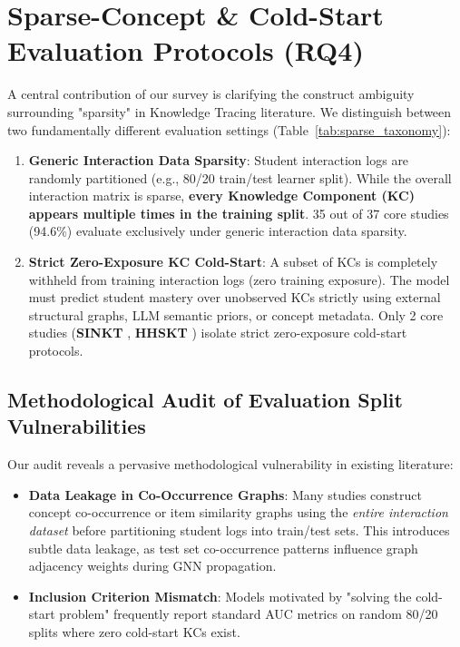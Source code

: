 \documentclass[10pt,journal,compsoc]{IEEEtran}
\begin{document}
\section{Sparse-Concept \& Cold-Start Evaluation Protocols (RQ4)}

A central contribution of our survey is clarifying the construct ambiguity surrounding "sparsity" in Knowledge Tracing literature. We distinguish between two fundamentally different evaluation settings (Table~\ref{tab:sparse_taxonomy}):
\begin{enumerate}
    \item \textbf{Generic Interaction Data Sparsity}: Student interaction logs are randomly partitioned (e.g., 80/20 train/test learner split). While the overall interaction matrix is sparse, \textbf{every Knowledge Component (KC) appears multiple times in the training split}. 35 out of 37 core studies (94.6\%) evaluate exclusively under generic interaction data sparsity.
    \item \textbf{Strict Zero-Exposure KC Cold-Start}: A subset of KCs is completely withheld from training interaction logs (zero training exposure). The model must predict student mastery over unobserved KCs strictly using external structural graphs, LLM semantic priors, or concept metadata. Only 2 core studies (\textbf{SINKT} \cite{KT044_SINKT_2024}, \textbf{HHSKT} \cite{KT035_HHSKT_2023}) isolate strict zero-exposure cold-start protocols.
\end{enumerate}

\subsection{Methodological Audit of Evaluation Split Vulnerabilities}
Our audit reveals a pervasive methodological vulnerability in existing literature:
\begin{itemize}
    \item \textbf{Data Leakage in Co-Occurrence Graphs}: Many studies construct concept co-occurrence or item similarity graphs using the \emph{entire interaction dataset} before partitioning student logs into train/test sets. This introduces subtle data leakage, as test set co-occurrence patterns influence graph adjacency weights during GNN propagation.
    \item \textbf{Inclusion Criterion Mismatch}: Models motivated by "solving the cold-start problem" frequently report standard AUC metrics on random 80/20 splits where zero cold-start KCs exist.
\end{itemize}
\end{document}
